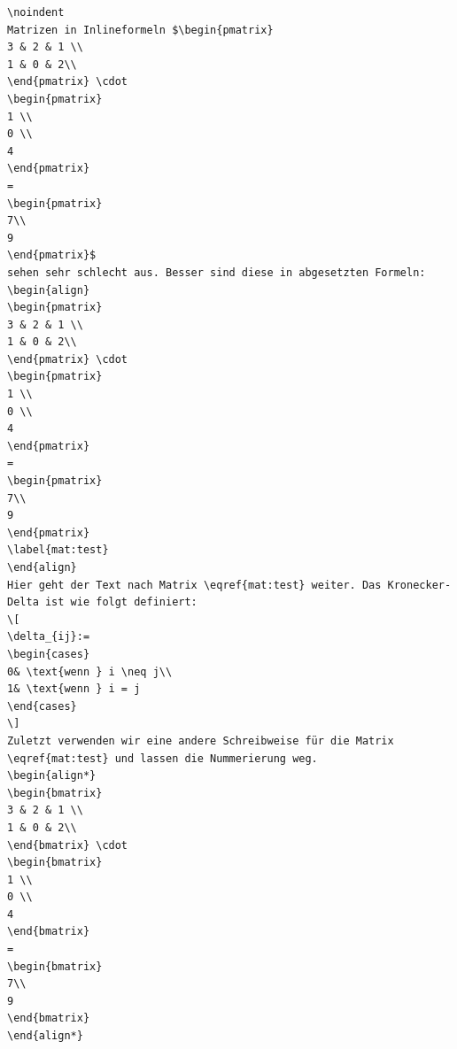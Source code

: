 \begin{Antwort}
\begin{lstlisting}[style=latex]
\noindent
Matrizen in Inlineformeln $\begin{pmatrix} 
3 & 2 & 1 \\ 
1 & 0 & 2\\
\end{pmatrix} \cdot 
\begin{pmatrix} 
1 \\ 
0 \\
4
\end{pmatrix}
=
\begin{pmatrix} 
7\\
9
\end{pmatrix}$
sehen sehr schlecht aus. Besser sind diese in abgesetzten Formeln:
\begin{align}
\begin{pmatrix} 
3 & 2 & 1 \\ 
1 & 0 & 2\\
\end{pmatrix} \cdot 
\begin{pmatrix} 
1 \\ 
0 \\
4
\end{pmatrix}
=
\begin{pmatrix} 
7\\
9
\end{pmatrix}
\label{mat:test}
\end{align}
Hier geht der Text nach Matrix \eqref{mat:test} weiter. Das Kronecker-Delta ist wie folgt definiert:
\[
\delta_{ij}:=
\begin{cases}
0& \text{wenn } i \neq j\\
1& \text{wenn } i = j
\end{cases}
\]
Zuletzt verwenden wir eine andere Schreibweise für die Matrix \eqref{mat:test} und lassen die Nummerierung weg.
\begin{align*}
\begin{bmatrix} 
3 & 2 & 1 \\ 
1 & 0 & 2\\
\end{bmatrix} \cdot 
\begin{bmatrix} 
1 \\ 
0 \\
4
\end{bmatrix}
=
\begin{bmatrix} 
7\\
9
\end{bmatrix}
\end{align*}
\end{lstlisting}
\end{Antwort}

